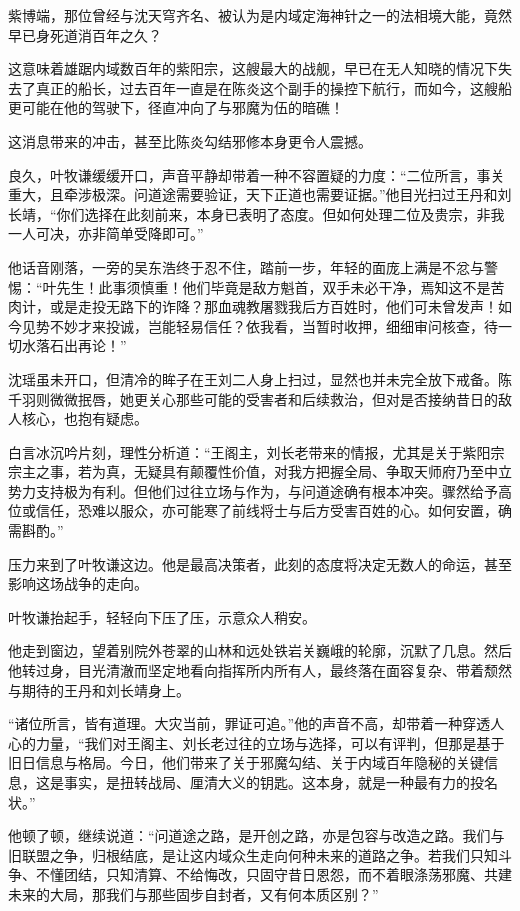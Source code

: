 紫博端，那位曾经与沈天穹齐名、被认为是内域定海神针之一的法相境大能，竟然早已身死道消百年之久？

这意味着雄踞内域数百年的紫阳宗，这艘最大的战舰，早已在无人知晓的情况下失去了真正的船长，过去百年一直是在陈炎这个副手的操控下航行，而如今，这艘船更可能在他的驾驶下，径直冲向了与邪魔为伍的暗礁！

这消息带来的冲击，甚至比陈炎勾结邪修本身更令人震撼。

\vspace{2em}

良久，叶牧谦缓缓开口，声音平静却带着一种不容置疑的力度：“二位所言，事关重大，且牵涉极深。问道途需要验证，天下正道也需要证据。”他目光扫过王丹和刘长靖，“你们选择在此刻前来，本身已表明了态度。但如何处理二位及贵宗，非我一人可决，亦非简单受降即可。”

他话音刚落，一旁的吴东浩终于忍不住，踏前一步，年轻的面庞上满是不忿与警惕：“叶先生！此事须慎重！他们毕竟是敌方魁首，双手未必干净，焉知这不是苦肉计，或是走投无路下的诈降？那血魂教屠戮我后方百姓时，他们可未曾发声！如今见势不妙才来投诚，岂能轻易信任？依我看，当暂时收押，细细审问核查，待一切水落石出再论！”

沈瑶虽未开口，但清冷的眸子在王刘二人身上扫过，显然也并未完全放下戒备。陈千羽则微微抿唇，她更关心那些可能的受害者和后续救治，但对是否接纳昔日的敌人核心，也抱有疑虑。

白言冰沉吟片刻，理性分析道：“王阁主，刘长老带来的情报，尤其是关于紫阳宗宗主之事，若为真，无疑具有颠覆性价值，对我方把握全局、争取天师府乃至中立势力支持极为有利。但他们过往立场与作为，与问道途确有根本冲突。骤然给予高位或信任，恐难以服众，亦可能寒了前线将士与后方受害百姓的心。如何安置，确需斟酌。”

压力来到了叶牧谦这边。他是最高决策者，此刻的态度将决定无数人的命运，甚至影响这场战争的走向。

叶牧谦抬起手，轻轻向下压了压，示意众人稍安。

他走到窗边，望着别院外苍翠的山林和远处铁岩关巍峨的轮廓，沉默了几息。然后他转过身，目光清澈而坚定地看向指挥所内所有人，最终落在面容复杂、带着颓然与期待的王丹和刘长靖身上。

“诸位所言，皆有道理。大灾当前，罪证可追。”他的声音不高，却带着一种穿透人心的力量，“我们对王阁主、刘长老过往的立场与选择，可以有评判，但那是基于旧日信息与格局。今日，他们带来了关于邪魔勾结、关于内域百年隐秘的关键信息，这是事实，是扭转战局、厘清大义的钥匙。这本身，就是一种最有力的投名状。”

他顿了顿，继续说道：“问道途之路，是开创之路，亦是包容与改造之路。我们与旧联盟之争，归根结底，是让这内域众生走向何种未来的道路之争。若我们只知斗争、不懂团结，只知清算、不给悔改，只固守昔日恩怨，而不着眼涤荡邪魔、共建未来的大局，那我们与那些固步自封者，又有何本质区别？”

